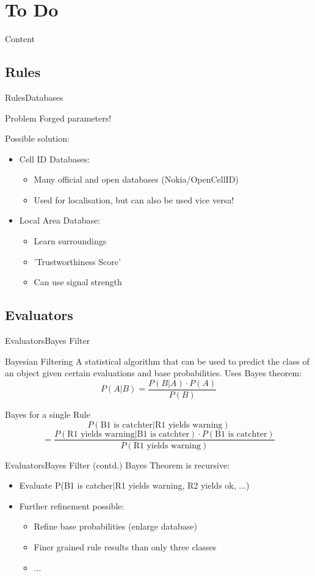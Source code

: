 \documentclass{beamer}
\newcommand{\tocsection}[1]{
  \section{#1}
  \begin{frame}{Content}
    \tableofcontents[sectionstyle=show/shaded,subsectionstyle=show/show/hide]
  \end{frame}
 }
\begin{document}
\tocsection{To Do}
\subsection{Rules}
\begin{frame}{Rules}{Databases}
\begin{alertblock}{Problem}
Forged parameters!
\end{alertblock}
Possible solution:
\begin{itemize}
	\item Cell ID Databases:
	\begin{itemize}
		\item Many official and open databases (Nokia/OpenCellID)
		\item Used for localisation, but can also be used vice versa!
	\end{itemize}
	\item Local Area Database:
	\begin{itemize}
		\item Learn surroundings
		\item 'Trustworthiness Score'
		\item Can use signal strength
	\end{itemize}
\end{itemize}
\end{frame}

\subsection{Evaluators}
\begin{frame}{Evaluators}{Bayes Filter}
\begin{block}{Bayesian Filtering}
A statistical algorithm that can be used to predict the class of an object given certain evaluations and base probabilities.
Uses Bayes theorem:
\[P(A\vert B)= \frac{P(B\vert A) \cdot P(A)}{P(B)}\]
\end{block}

\begin{exampleblock}{Bayes for a single Rule}
\[P(\text{B1 is catchter}\vert \text{R1 yields warning})\] 
\[=\frac{P(\text{R1 yields warning}\vert \text{B1 is catchter}) \cdot P(\text{B1 is catchter})}{P(\text{R1 yields warning})}\]
\end{exampleblock}
\end{frame}

\begin{frame}{Evaluators}{Bayes Filter (contd.)}
Bayes Theorem is recursive:
\begin{itemize}
	\item Evaluate P(B1 is catcher$\vert$R1 yields warning, R2 yields ok, $\ldots$)
	\item Further refinement possible:
	\begin{itemize}
		\item Refine base probabilities (enlarge database)
		\item Finer grained rule results than only three classes
		\item $\ldots$
	\end{itemize}
\end{itemize}
\end{frame}
\end{document}
